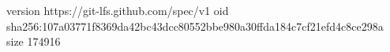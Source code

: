 version https://git-lfs.github.com/spec/v1
oid sha256:107a03771f8369da42bc43dcc80552bbe980a30ffda184c7cf21efd4c8ce298a
size 174916
